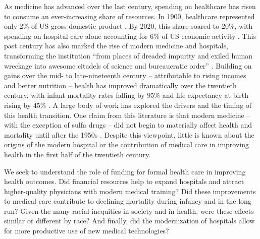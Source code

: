 \documentclass[12pt]{article}
\begin{document}
\onehalfspacing


As medicine has advanced over the last century, spending on healthcare has risen to consume an ever-increasing share of resources. 
In 1900, healthcare represented only 2\% of US gross domestic product . 
By 2020, this share soared to 20\%, with spending on hospital care alone accounting for 6\% of US economic activity . 
This past century has also marked the rise of modern medicine and hospitals, transforming the institution ``from places of dreaded impurity and exiled human wreckage into awesome citadels of science and bureaucratic order'' . 
Building on gains over the mid- to late-nineteenth century -- attributable to rising incomes and better nutrition -- health has improved dramatically over the twentieth century, with infant mortality rates falling by 95\% and life expectancy at birth rising by 45\% . 
A large body of work has explored the drivers and the timing of this health transition. 
One claim from this literature is that modern medicine -- with the exception of sulfa drugs -- did not begin to materially affect health and mortality until after the 1950s .
Despite this viewpoint, little is known about the origins of the modern hospital or the contribution of medical care in improving health in the first half of the twentieth century.




We seek to understand the role of funding for formal health care in improving health outcomes.
Did financial resources help to expand hospitals and attract higher-quality physicians with modern medical training? 
Did these improvements to medical care contribute to declining mortality during infancy and in the long run?
Given the many racial inequities in society and in health, were these effects similar or different by race?
And finally, did the modernization of hospitals allow for more productive use of new medical technologies?
\end{document}
